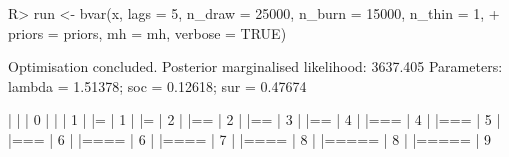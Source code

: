 \documentclass[article,nojss]{jss} %
\begin{document}
\begin{Schunk}
\begin{Sinput}
R> run <- bvar(x, lags = 5, n_draw = 25000, n_burn = 15000, n_thin = 1,
+    priors = priors, mh = mh, verbose = TRUE)
\end{Sinput}
\begin{Soutput}
Optimisation concluded.
Posterior marginalised likelihood: 3637.405
Parameters: lambda = 1.51378; soc = 0.12618; sur = 0.47674

  |                                                                  
  |                                                            |   0%
  |                                                                  
  |                                                            |   1%
  |                                                                  
  |=                                                           |   1%
  |                                                                  
  |=                                                           |   2%
  |                                                                  
  |==                                                          |   2%
  |                                                                  
  |==                                                          |   3%
  |                                                                  
  |==                                                          |   4%
  |                                                                  
  |===                                                         |   4%
  |                                                                  
  |===                                                         |   5%
  |                                                                  
  |===                                                         |   6%
  |                                                                  
  |====                                                        |   6%
  |                                                                  
  |====                                                        |   7%
  |                                                                  
  |====                                                        |   8%
  |                                                                  
  |=====                                                       |   8%
  |                                                                  
  |=====                                                       |   9%

\end{Soutput}
\end{Schunk}
\end{document}
